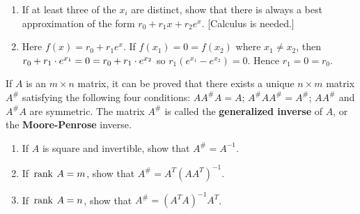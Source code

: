 \begin{multicols}{2}
\begin{ex}
\begin{enumerate}[label={\alph*.}]
\item If at least three of the $x_{i}$ are distinct, show that there is always a best approximation of the form $r_{0} + r_{1}x + r_{2}e^{x}$. [Calculus is needed.]

\end{enumerate}
\begin{sol}
\begin{enumerate}[label={\alph*.}]
\setcounter{enumi}{1}
\item  Here $f(x) = r_{0} + r_{1}e^{x}$. If $f(x_{1}) = 0 = f(x_{2})$ where $x_{1} \neq x_{2}$, then $r_0 + r_1 \cdot e^{x_1} = 0 = r_0 + r_1 \cdot e^{x_2}$ so $r_1(e^{x_1} - e^{x_2}) = 0$. Hence $r_{1} = 0 = r_{0}$.

\end{enumerate}
\end{sol}
\end{ex}

\begin{ex}
	\label{ex:5_6_14}
If $A$ is an $m \times n$ matrix, it can be proved that there exists a unique $n \times m$ matrix $A^{\#}$ satisfying the following four conditions: $AA^{\#}A = A$; $A^{\#}AA^{\#} = A^{\#}$; $AA^{\#}$ and $A^{\#}A$ are symmetric. The matrix $A^{\#}$ is called the \textbf{generalized inverse} of $A$, or the \textbf{Moore-Penrose} inverse.

\begin{enumerate}[label={\alph*.}]
\item If $A$ is square and invertible, show that $A^{\#} = A^{-1}$.

\item If $\thinspace\operatorname{rank\medspace} A = m$, show that $A^{\#} = A^{T}(AA^{T})^{-1}$.

\item If $\thinspace\operatorname{rank\medspace} A = n$, show that $A^{\#} = (A^{T}A)^{-1}A^{T}$.

\end{enumerate}
\end{ex}
\end{multicols}
